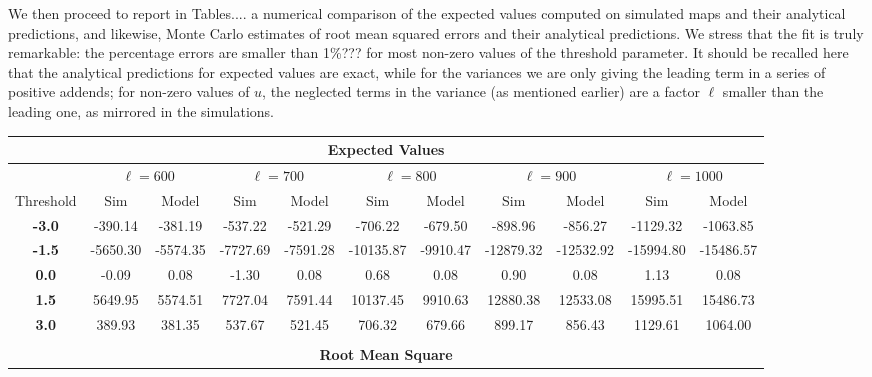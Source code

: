 \documentclass[aps,prd,showpacs,superscriptaddress,groupedaddress]{revtex4-1}  %
\begin{document}
We then proceed to report in Tables.... a numerical comparison of the expected values computed on simulated maps and their analytical predictions, and likewise, Monte Carlo estimates of root mean squared errors and their analytical predictions. We stress that the fit is truly remarkable: the percentage errors are smaller than 1\%??? for most non-zero values of the threshold parameter. It should be recalled here that the analytical predictions for expected values are exact, while for the variances we are only giving the leading term in a series of positive addends; for non-zero values of $u$, the neglected terms in the variance (as mentioned earlier) are a factor $\ell$ smaller than the leading one, as mirrored in the simulations. 

\begin{table}
\centering
\begin{tabular}{|c||c|c|c|c|c|c|c|c|c|c|}

\multicolumn{11}{c}{\textbf{Expected Values}}   \\
\hline 
& \multicolumn{2}{c|}{$\ell=600$} & \multicolumn{2}{c|}{$\ell=700$} & \multicolumn{2}{c|}{$\ell=800$} & \multicolumn{2}{c|}{$\ell=900$} & \multicolumn{2}{c|}{$\ell=1000$}\\ 
 \hline
Threshold & Sim & Model & Sim & Model & Sim & Model & Sim & Model & Sim & Model\\ 
 \hline
\textbf{-3.0} & -390.14 & -381.19 & -537.22 & -521.29 & -706.22 & -679.50 & -898.96 & -856.27 & -1129.32 & -1063.85\\
\textbf{-1.5} & -5650.30 & -5574.35 & -7727.69 & -7591.28 & -10135.87 & -9910.47 & -12879.32 & -12532.92 & -15994.80 & -15486.57\\
\textbf{0.0} & -0.09 & 0.08 & -1.30 & 0.08 & 0.68 & 0.08 & 0.90 & 0.08 & 1.13 & 0.08\\
\textbf{1.5} & 5649.95 & 5574.51 & 7727.04 & 7591.44 & 10137.45 & 9910.63 & 12880.38 & 12533.08 & 15995.51 & 15486.73\\
\textbf{3.0} & 389.93 & 381.35 & 537.67 & 521.45 & 706.32 & 679.66 & 899.17 & 856.43 & 1129.61 & 1064.00\\

\hline 
\multicolumn{11}{c}{}   \\
\multicolumn{11}{c}{\textbf{Root Mean Square}}   \\
\hline 


\end{tabular}
\end{table}
\end{document}
